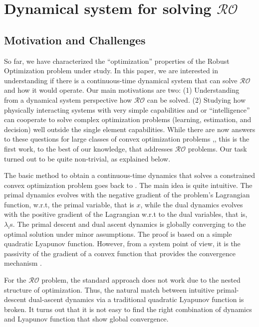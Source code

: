 \documentclass[journal,twoside,web]{ieeecolor}
\begin{document}
\section{Dynamical system for solving $\mathcal{RO}$} \label{section_pddynamics}

\subsection*{Motivation and Challenges}

So far, we have characterized the ``optimization'' properties of the Robust Optimization problem under study. In this paper, we are interested in understanding if there is a continuous-time dynamical system that can solve $\mathcal{RO}$ and how it would operate. Our main motivations are two: (1) Understanding from a dynamical system perspective how $\mathcal{RO}$ can be solved. (2) Studying how physically interacting systems with very simple capabilities and or ``intelligence'' can cooperate to solve complex optimization problems (learning, estimation, and decision) well outside the single element capabilities. While there are now answers to these questions for large classes of convex optimization problems \cite{feijer2010},\cite{wang2011}, this is the first work, to the best of our knowledge, that addresses $\mathcal{RO}$ problems. Our task turned out to be quite non-trivial, as explained below.

The basic method to obtain a continuous-time dynamics that solves a constrained convex optimization problem goes back to \cite{arrow1958}. The main idea is quite intuitive. The primal dynamics evolves with the negative gradient of the problem's Lagrangian function, w.r.t, the primal variable, that is $x$, while the dual dynamics evolves with the positive gradient of the Lagrangian w.r.t to the dual variables, that is, $\lambda_i$s. The primal descent and dual ascent dynamics is globally converging to the optimal solution under minor assumptions. The proof is based on a simple quadratic Lyapunov function. However, from a system point of view, it is the passivity of the gradient of a convex function that provides the convergence mechanism \cite{simpson2016,kosaraju2018}.

For the $\mathcal{RO}$ problem, the standard approach does not work due to the nested structure of optimization. Thus, the natural match between intuitive primal-descent dual-ascent dynamics via a traditional quadratic Lyapunov function is broken. It turns out that it is not easy to find the right combination of dynamics and Lyapunov function that show global convergence.
\end{document}

